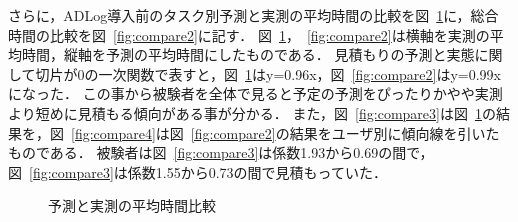 さらに，ADLog導入前のタスク別予測と実測の平均時間の比較を図~\ref{fig:compare}に，総合時間の比較を図~\ref{fig:compare2}に記す．
図~\ref{fig:compare}，~\ref{fig:compare2}は横軸を実測の平均時間，縦軸を予測の平均時間にしたものである．
見積もりの予測と実態に関して切片が0の一次関数で表すと，図~\ref{fig:compare}はy=0.96x，図~\ref{fig:compare2}はy=0.99xになった．
この事から被験者を全体で見ると予定の予測をぴったりかやや実測より短めに見積もる傾向がある事が分かる．
また，図~\ref{fig:compare3}は図~\ref{fig:compare}の結果を，図~\ref{fig:compare4}は図~\ref{fig:compare2}の結果をユーザ別に傾向線を引いたものである．
被験者は図~\ref{fig:compare3}は係数1.93から0.69の間で，図~\ref{fig:compare3}は係数1.55から0.73の間で見積もっていた．

\begin{figure}[hb]
	\begin{center}
		\caption{予測と実測の平均時間比較}
		\label{fig:compare}
	\end{center}
\end{figure}

